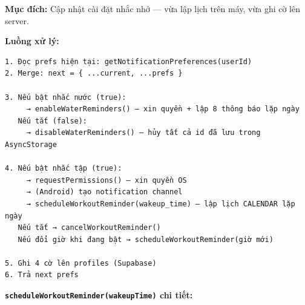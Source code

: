 \documentclass[12pt,a4paper]{article}
\begin{document}
\textbf{Mục đích:} Cập nhật cài đặt nhắc nhở --- vừa lập lịch trên máy,
vừa ghi cờ lên server.

\textbf{Luồng xử lý:}

\begin{verbatim}
1. Đọc prefs hiện tại: getNotificationPreferences(userId)
2. Merge: next = { ...current, ...prefs }

3. Nếu bật nhắc nước (true):
     → enableWaterReminders() — xin quyền + lập 8 thông báo lặp ngày
   Nếu tắt (false):
     → disableWaterReminders() — hủy tất cả id đã lưu trong AsyncStorage

4. Nếu bật nhắc tập (true):
     → requestPermissions() — xin quyền OS
     → (Android) tạo notification channel
     → scheduleWorkoutReminder(wakeup_time) — lập lịch CALENDAR lặp ngày
   Nếu tắt → cancelWorkoutReminder()
   Nếu đổi giờ khi đang bật → scheduleWorkoutReminder(giờ mới)

5. Ghi 4 cờ lên profiles (Supabase)
6. Trả next prefs
\end{verbatim}

\textbf{\texttt{scheduleWorkoutReminder(wakeupTime)} chi tiết:}

\begin{Shaded}
\begin{Highlighting}[]
 \NormalTok{()}\OperatorTok{;}           
\OperatorTok{,}\OperatorTok{=} \OperatorTok{;}  
\OperatorTok{=} \NormalTok{(\{}
\OperatorTok{:}\OperatorTok{:} \OperatorTok{,}\OperatorTok{:} \OperatorTok{,}\OperatorTok{:} \NormalTok{ \}}\OperatorTok{,}
\OperatorTok{:}\OperatorTok{:}\OperatorTok{,}\OperatorTok{,}\OperatorTok{,}\OperatorTok{:} \NormalTok{ \}}\OperatorTok{,}  
\NormalTok{\})}\OperatorTok{;}
\OperatorTok{,}\OperatorTok{;}  
\end{Highlighting}
\end{Shaded}
\end{document}
